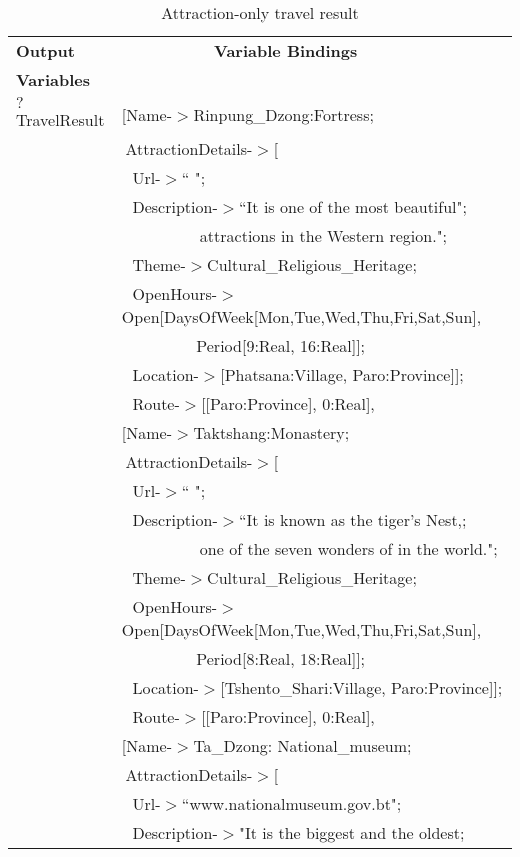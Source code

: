 \begin{table} [tbph]
\caption{Attraction-only travel result}
\centering
\footnotesize
\begin{tabular}{|l|l|}
\hline
 \textbf{Output} &$~~~~~~~~~~~~~~~~~~~~~~~~~~$\textbf{Variable Bindings} \\
 \textbf{Variables}&                \\
\hline
 $?$TravelResult&\cellcolor{yellow}[Name-$>$Rinpung\_Dzong:Fortress;\\
  		 &$~$AttractionDetails-$>$[ \\
  		 &$~~~$Url-$>$`` ";	\\
		    &$~~~$Description-$>$``It is one of the most beautiful";\\
			  &$~~~~~~~~~~~~~~~~~~~~~~$attractions in the Western region.";\\
			  &$~~~$Theme-$>$Cultural\_Religious\_Heritage;\\
			  &$~~~$OpenHours-$>$Open[DaysOfWeek[Mon,Tue,Wed,Thu,Fri,Sat,Sun],\\
		  	&$~~~~~~~~~~~~~~~~~~~~~$Period[9:Real, 16:Real]];\\
			&$~~~$Location-$>$[Phatsana:Village, Paro:Province]];\\
			&$~~~$Route-$>$[[Paro:Province], 0:Real],\\
       &\cellcolor{yellow}[Name-$>$Taktshang:Monastery;\\
  		 &$~$AttractionDetails-$>$[ \\
  		 &$~~~$Url-$>$`` ";	\\
		    &$~~~$Description-$>$``It is known as the tiger's Nest,;\\
			  &$~~~~~~~~~~~~~~~~~~~~~~$one of the seven wonders of in the world.";\\
			  &$~~~$Theme-$>$Cultural\_Religious\_Heritage;\\
			  &$~~~$OpenHours-$>$Open[DaysOfWeek[Mon,Tue,Wed,Thu,Fri,Sat,Sun],\\
		  	&$~~~~~~~~~~~~~~~~~~~~~$Period[8:Real, 18:Real]];\\
			&$~~~$Location-$>$[Tshento\_Shari:Village, Paro:Province]];\\
			&$~~~$Route-$>$[[Paro:Province], 0:Real],\\
			&\cellcolor{yellow}[Name-$>$Ta\_Dzong: National\_museum;\\
  		 &$~$AttractionDetails-$>$[ \\
  		 &$~~~$Url-$>$``www.nationalmuseum.gov.bt";	\\
		    &$~~~$Description-$>$"It is the biggest and the oldest;\\

\end{tabular}
\end{table}
